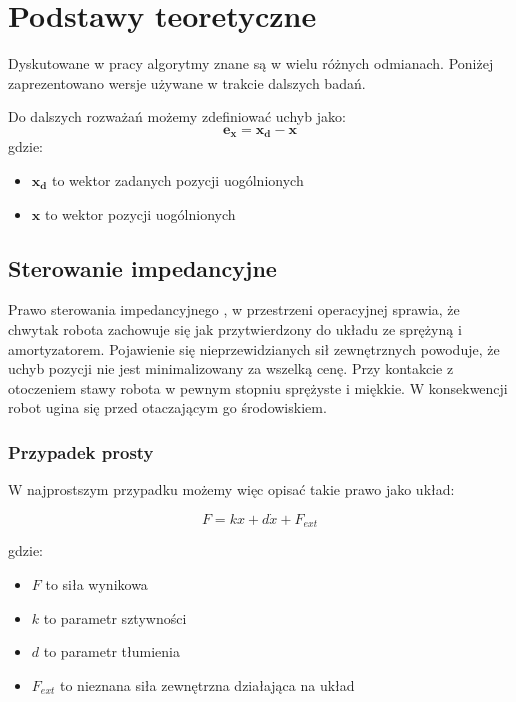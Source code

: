 
\chapter{Podstawy teoretyczne\label{chap:przeglad_literatury}}
Dyskutowane w pracy algorytmy znane są w wielu różnych odmianach. Poniżej zaprezentowano wersje używane w trakcie dalszych badań. 

Do dalszych rozważań możemy zdefiniować uchyb jako:
\begin{equation}
	\boldsymbol{e_x} = \boldsymbol{x_d} - \boldsymbol{x}
\end{equation}
gdzie:
\begin{itemize}
\item $\boldsymbol{x_d}$ to wektor zadanych pozycji uogólnionych
\item $\boldsymbol{x}$ to wektor pozycji uogólnionych
\end{itemize}

\section{Sterowanie impedancyjne}
Prawo sterowania impedancyjnego \cite{bib:impedance}, \cite{wiki:Impedance_control} w przestrzeni operacyjnej sprawia, że chwytak robota zachowuje się jak przytwierdzony do układu ze sprężyną i amortyzatorem. Pojawienie się nieprzewidzianych sił zewnętrznych powoduje, że uchyb pozycji nie jest minimalizowany za wszelką cenę. Przy kontakcie z otoczeniem stawy robota w pewnym stopniu sprężyste i miękkie. W konsekwencji robot ugina się przed otaczającym go środowiskiem. 

\subsection{Przypadek prosty}
W najprostszym przypadku możemy więc opisać takie prawo jako układ: 

	\begin{equation}
	F = kx + d\dot{x} + F_{ext}
	\end{equation}

gdzie:
\begin{itemize}
\item $F$ to siła wynikowa
\item $k$ to parametr sztywności
\item $d$ to parametr tłumienia
\item $F_{ext}$ to nieznana siła zewnętrzna działająca na układ
\end{itemize} 

